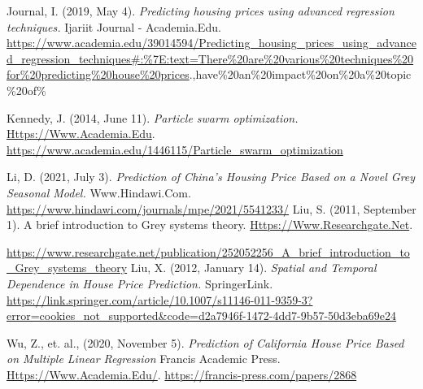 \documentclass[
]{article}
\begin{document}
Journal, I. (2019, May 4). \emph{Predicting housing prices using
advanced regression techniques.} Ijariit Journal - Academia.Edu.
\url{https://www.academia.edu/39014594/Predicting_housing_prices_using_advanced_regression_techniques\#:\%7E:text=There\%20are\%20various\%20techniques\%20for\%20predicting\%20house\%20prices}.,have\%20an\%20impact\%20on\%20a\%20topic\%20of\%

Kennedy, J. (2014, June 11). \emph{Particle swarm optimization.}
\url{Https://Www.Academia.Edu}.
\url{https://www.academia.edu/1446115/Particle_swarm_optimization}

Li, D. (2021, July 3). \emph{Prediction of China's Housing Price Based
on a Novel Grey Seasonal Model.} Www.Hindawi.Com.
\url{https://www.hindawi.com/journals/mpe/2021/5541233/} Liu, S. (2011,
September 1). A brief introduction to Grey systems theory.
\url{Https://Www.Researchgate.Net}.

\url{https://www.researchgate.net/publication/252052256_A_brief_introduction_to_Grey_systems_theory}
Liu, X. (2012, January 14). \emph{Spatial and Temporal Dependence in
House Price Prediction.} SpringerLink.
\url{https://link.springer.com/article/10.1007/s11146-011-9359-3?error=cookies_not_supported\&code=d2a7946f-1472-4dd7-9b57-50d3eba69e24}

Wu, Z., et. al., (2020, November 5). \emph{Prediction of California
House Price Based on Multiple Linear Regression} \textbar{} Francis
Academic Press. \url{Https://Www.Academia.Edu/}.
\url{https://francis-press.com/papers/2868}
\end{document}
